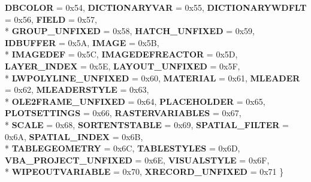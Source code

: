 \begin{DoxyCompactItemize}
{\bfseries D\+B\+C\+O\+L\+OR} = 0x54, 
{\bfseries D\+I\+C\+T\+I\+O\+N\+A\+R\+Y\+V\+AR} = 0x55, 
{\bfseries D\+I\+C\+T\+I\+O\+N\+A\+R\+Y\+W\+D\+F\+LT} = 0x56, 
{\bfseries F\+I\+E\+LD} = 0x57, 
\\*
{\bfseries G\+R\+O\+U\+P\+\_\+\+U\+N\+F\+I\+X\+ED} = 0x58, 
{\bfseries H\+A\+T\+C\+H\+\_\+\+U\+N\+F\+I\+X\+ED} = 0x59, 
{\bfseries I\+D\+B\+U\+F\+F\+ER} = 0x5A, 
{\bfseries I\+M\+A\+GE} = 0x5B, 
\\*
{\bfseries I\+M\+A\+G\+E\+D\+EF} = 0x5C, 
{\bfseries I\+M\+A\+G\+E\+D\+E\+F\+R\+E\+A\+C\+T\+OR} = 0x5D, 
{\bfseries L\+A\+Y\+E\+R\+\_\+\+I\+N\+D\+EX} = 0x5E, 
{\bfseries L\+A\+Y\+O\+U\+T\+\_\+\+U\+N\+F\+I\+X\+ED} = 0x5F, 
\\*
{\bfseries L\+W\+P\+O\+L\+Y\+L\+I\+N\+E\+\_\+\+U\+N\+F\+I\+X\+ED} = 0x60, 
{\bfseries M\+A\+T\+E\+R\+I\+AL} = 0x61, 
{\bfseries M\+L\+E\+A\+D\+ER} = 0x62, 
{\bfseries M\+L\+E\+A\+D\+E\+R\+S\+T\+Y\+LE} = 0x63, 
\\*
{\bfseries O\+L\+E2\+F\+R\+A\+M\+E\+\_\+\+U\+N\+F\+I\+X\+ED} = 0x64, 
{\bfseries P\+L\+A\+C\+E\+H\+O\+L\+D\+ER} = 0x65, 
{\bfseries P\+L\+O\+T\+S\+E\+T\+T\+I\+N\+GS} = 0x66, 
{\bfseries R\+A\+S\+T\+E\+R\+V\+A\+R\+I\+A\+B\+L\+ES} = 0x67, 
\\*
{\bfseries S\+C\+A\+LE} = 0x68, 
{\bfseries S\+O\+R\+T\+E\+N\+T\+S\+T\+A\+B\+LE} = 0x69, 
{\bfseries S\+P\+A\+T\+I\+A\+L\+\_\+\+F\+I\+L\+T\+ER} = 0x6A, 
{\bfseries S\+P\+A\+T\+I\+A\+L\+\_\+\+I\+N\+D\+EX} = 0x6B, 
\\*
{\bfseries T\+A\+B\+L\+E\+G\+E\+O\+M\+E\+T\+RY} = 0x6C, 
{\bfseries T\+A\+B\+L\+E\+S\+T\+Y\+L\+ES} = 0x6D, 
{\bfseries V\+B\+A\+\_\+\+P\+R\+O\+J\+E\+C\+T\+\_\+\+U\+N\+F\+I\+X\+ED} = 0x6E, 
{\bfseries V\+I\+S\+U\+A\+L\+S\+T\+Y\+LE} = 0x6F, 
\\*
{\bfseries W\+I\+P\+E\+O\+U\+T\+V\+A\+R\+I\+A\+B\+LE} = 0x70, 
{\bfseries X\+R\+E\+C\+O\+R\+D\+\_\+\+U\+N\+F\+I\+X\+ED} = 0x71
 \}\hypertarget{class_c_a_d_object_a9db91e0070823b565bf904ac8bc52194}{}\label{class_c_a_d_object_a9db91e0070823b565bf904ac8bc52194}

\end{DoxyCompactItemize}
